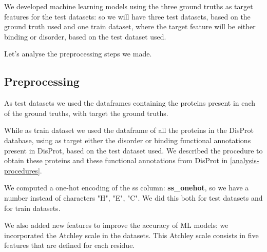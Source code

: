We developed machine learning models using the three ground truths as target features for the test datasets: so we will have three test datasets, based on the ground truth used and one train dataset, where the target feature will be either binding or disorder, based on the test dataset used.

Let's analyse the preprocessing steps we made.

\vspace{5em}

\subsection{Preprocessing}
As test datasets we used the dataframes containing the proteins present in each of the ground truths, with target the ground truths.

While as train dataset we used the dataframe of all the proteins in the DisProt database, using as target either the disorder or binding functional annotations present in DisProt, based on the test dataset used. We described the procedure to obtain these proteins and these functional annotations from DisProt in \ref{analysis-procedures}.

We computed a one-hot encoding of the ss column: \textbf{ss\_onehot}, so we have a number instead of characters "H", "E", "C". We did this both for test datasets and for train datasets. 

We also added new features to improve the accuracy of ML models: we incorporated the Atchley scale in the datasets. This Atchley scale consists in five features that are defined for each residue.

\pagebreak

